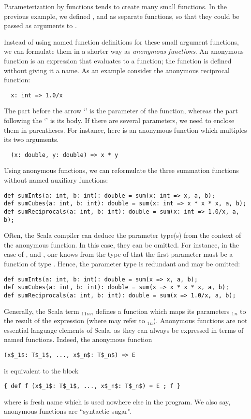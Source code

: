 \documentclass[a4paper,12pt,twoside,titlepage]{book}
\begin{document}
Parameterization by functions tends to create many small functions. In
the previous example, we defined ,  and
 as separate functions, so that they could be 
passed as arguments to .

Instead of using named function definitions for these small argument
functions, we can formulate them in a shorter way as {\em anonymous
functions}. An anonymous function is an expression that evaluates to a
function; the function is defined without giving it a name. As an
example consider the anonymous reciprocal function:
\begin{lstlisting}
  x: int => 1.0/x
\end{lstlisting}
The part before the arrow `\code{=>}' is the parameter of the function,
whereas the part following the `\code{=>}' is its body. If there are
several parameters, we need to enclose them in parentheses. For
instance, here is an anonymous function which multiples its two arguments.
\begin{lstlisting}
  (x: double, y: double) => x * y
\end{lstlisting}
Using anonymous functions, we can reformulate the three summation
functions without named auxiliary functions:
\begin{lstlisting}
def sumInts(a: int, b: int): double = sum(x: int => x, a, b);
def sumCubes(a: int, b: int): double = sum(x: int => x * x * x, a, b);
def sumReciprocals(a: int, b: int): double = sum(x: int => 1.0/x, a, b);
\end{lstlisting}
Often, the Scala compiler can deduce the parameter type(s) from the
context of the anonymous function. In this case, they can be omitted.
For instance, in the case of ,  and
, one knows from the type of
 that the first parameter must be a function of type
.  Hence, the parameter type  is
redundant and may be omitted:
\begin{lstlisting}
def sumInts(a: int, b: int): double = sum(x => x, a, b);
def sumCubes(a: int, b: int): double = sum(x => x * x * x, a, b);
def sumReciprocals(a: int, b: int): double = sum(x => 1.0/x, a, b);
\end{lstlisting}

Generally, the Scala term
$_1$$_1$$_n$$_n$ 
defines a function which maps its parameters
$_1$$_n$ to the result of the expression 
(where  may refer to $_1$$_n$).  Anonymous
functions are not essential language elements of Scala, as they can
always be expressed in terms of named functions. Indeed, the 
anonymous function
\begin{lstlisting}
(x$_1$: T$_1$, ..., x$_n$: T$_n$) => E
\end{lstlisting}
is equivalent to the block
\begin{lstlisting}
{ def f (x$_1$: T$_1$, ..., x$_n$: T$_n$) = E ; f }
\end{lstlisting}
where  is fresh name which is used nowhere else in the program.
We also say, anonymous functions are ``syntactic sugar''.
\end{document}
